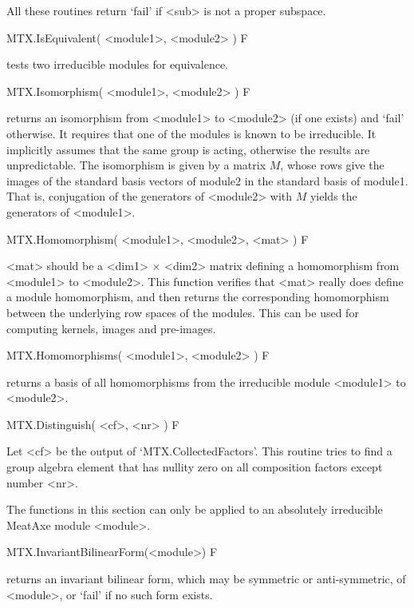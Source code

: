 All these routines return `fail' if <sub> is not a proper subspace.


\>MTX.IsEquivalent( <module1>, <module2> ) F

tests two irreducible modules for equivalence.

\>MTX.Isomorphism( <module1>, <module2> ) F

returns an isomorphism from <module1> to <module2> (if one exists) and 
`fail' otherwise. It requires that one of the modules is known to be
irreducible. It implicitly assumes that the same group is acting, otherwise
the results are unpredictable.
The isomorphism is given by a matrix $M$, whose rows give the images of the
standard basis vectors of module2 in the standard basis of module1. That is,
conjugation of the generators of <module2> with $M$ yields the
generators of <module1>.

\>MTX.Homomorphism( <module1>, <module2>, <mat> ) F

<mat> should be a <dim1> $\times$ <dim2> matrix defining a homomorphism
from <module1> to <module2>.  This function verifies that <mat>
really does define a module homomorphism, and then returns the
corresponding homomorphism between the underlying row spaces of the
modules. This can be used for computing kernels, images and pre-images.

\>MTX.Homomorphisms( <module1>, <module2> ) F

returns a basis of all homomorphisms from the irreducible module 
<module1> to <module2>.

\>MTX.Distinguish( <cf>, <nr> ) F

Let <cf> be the output of `MTX.CollectedFactors'. This routine
tries to find a group algebra element that has nullity zero on all
composition factors except number <nr>.




The functions in this section can only be applied to an absolutely irreducible
MeatAxe module <module>.

\>MTX.InvariantBilinearForm(<module>) F

returns an invariant bilinear form, which may be symmetric or anti-symmetric,
of <module>, or `fail' if no such form exists.


